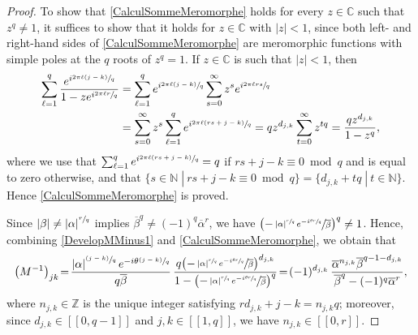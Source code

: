 \documentclass[JEP,XML,SOM,Unicode]{cedram}
\newcommand{\psfrac}[2]{\sfrac{(#1)}{#2}}
\newcommand{\llbracket}{[\![}
\newcommand{\rrbracket}{]\!]}
\theoremstyle{plain}
\theoremstyle{definition}
\newcommand{\suchthat}{\;|\:}
\newcommand{\abs}[1]{\left\lvert #1\right \rvert}
\begin{document}
\begin{proof}
To show that \eqref{CalculSommeMeromorphe} holds for every $z \in \mathbb C$ such that $z^q \neq 1$, it suffices to show that it holds for $z \in \mathbb C$ with $\abs{z} < 1$, since both left- and right-hand sides of \eqref{CalculSommeMeromorphe} are meromorphic functions with simple poles at the $q$ roots of $z^q = 1$. If $z \in \mathbb C$ is such that $\abs{z} < 1$, then\vspace*{-3pt}
\begin{align*}
\sum_{\ell=1}^q \frac{e^{i \sfrac{2\pi \ell (j - k)}{q}}}{1 - z e^{i \sfrac{2 \pi \ell r}{q}}} &= \sum_{\ell=1}^q e^{i \sfrac{2\pi \ell (j - k)}{q}} \sum_{s=0}^\infty z^s e^{i \sfrac{2 \pi \ell r s}{q}}\\
&= \sum_{s=0}^\infty z^s \sum_{\ell=1}^q e^{i \sfrac{2\pi \ell (r s + j - k)}{q}} = q z^{d_{j, k}} \sum_{t = 0}^\infty z^{t q} = \frac{q z^{d_{j, k}}}{1 - z^q},
\end{align*}
where we use that $\sum_{\ell=1}^q e^{i \sfrac{2\pi \ell (r s + j - k)}{q}} = q$ if $r s + j - k \equiv 0 \bmod q$ and is equal to zero otherwise, and that $\{s \in \mathbb N \suchthat r s + j - k \equiv 0 \bmod q\} = \{d_{j, k} + t q \suchthat t \in \mathbb N\}$. Hence \eqref{CalculSommeMeromorphe} is proved.

Since $\abs{\beta} \neq \abs{\alpha}^{\sfrac{r}{q}}$ implies $\overline\beta^q \neq (-1)^q \overline\alpha^r$, we have $\bigl(-\sfrac{\abs{\alpha}^{\sfrac{r}{q}} e^{-i\sfrac{\theta r}{q}}}{\overline\beta}\bigr)^q \neq 1$. Hence, combining \eqref{DevelopMMinus1} and \eqref{CalculSommeMeromorphe}, we obtain that\vspace*{-3pt}
\[
\left(M^{-1}\right)_{jk} \!=\! \frac{\abs{\alpha}^{\psfrac{j-k}{q}} e^{-i\theta\psfrac{j-k}{q}}}{q \overline\beta}\, \frac{q \bigl(-\sfrac{\abs{\alpha}^{\sfrac{r}{q}} e^{-i\sfrac{\theta r}{q}}}{\overline\beta}\bigr)^{d_{j, k}}}{1 - \bigl(-\sfrac{\abs{\alpha}^{\sfrac{r}{q}} e^{-i\sfrac{\theta r}{q}}}{\overline\beta}\bigr)^q} \!=\! (-1)^{d_{j, k}}\, \frac{\overline\alpha^{n_{j, k}}\overline\beta^{q-1-d_{j,k}}}{\overline\beta^q - (-1)^q \overline\alpha^r},
\]
where $n_{j, k} \in \mathbb Z$ is the unique integer satisfying $r d_{j, k} + j - k = n_{j, k} q$; moreover, since $d_{j, k} \in \llbracket 0, q-1\rrbracket$ and $j, k \in \llbracket 1, q\rrbracket$, we have $n_{j, k} \in \llbracket 0, r\rrbracket$.


\end{proof}
\end{document}
